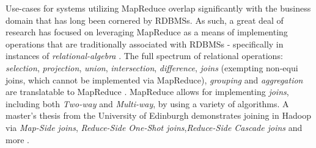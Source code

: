 Use-cases for systems utilizing MapReduce overlap significantly with the business domain that has long been cornered by RDBMSs. As such, a great deal of research has focused on leveraging MapReduce as a means of implementing operations that are traditionally associated with RDBMSs - specifically in instances of \textit{relational-algebra} \cite{mining2011,chandar2010}. The full spectrum of relational operations: \textit{selection}, \textit{projection}, \textit{union}, \textit{intersection}, \textit{difference}, \textit{joins} (exempting non-equi joins, which cannot be implemented via MapReduce), \textit{grouping} and \textit{aggregation} are translatable to MapReduce \cite{mining2011}. MapReduce allows for implementing \textit{joins}, including both \textit{Two-way} and \textit{Multi-way}, by using a variety of algorithms. A master’s thesis from the University of Edinburgh demonstrates joining in Hadoop via \textit{Map-Side joins}, \textit{Reduce-Side One-Shot joins},\textit{Reduce-Side Cascade joins} and more \cite{chandar2010}.